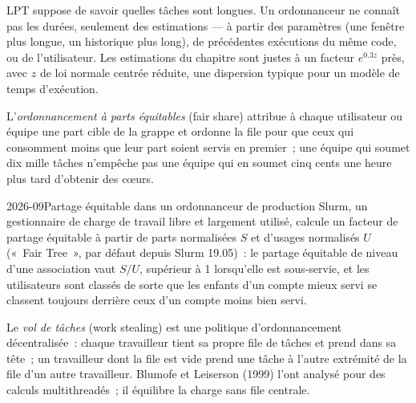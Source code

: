 \label{lst:pl:distributed-compute-and-schedulers:bound}

LPT suppose de savoir quelles tâches sont longues. Un ordonnanceur ne connaît pas les durées, seulement des estimations --- à partir des paramètres (une fenêtre plus longue, un historique plus long), de
précédentes exécutions du même code, ou de l'utilisateur. Les estimations du chapitre sont justes à un facteur $e^{0.3z}$ près, avec
$z$ de loi normale centrée réduite, une dispersion typique pour un modèle de temps d'exécution.

\begin{definition}\label{def:pl:distributed-compute-and-schedulers:fairshare}
L'\emph{ordonnancement à parts équitables} (fair share) attribue à chaque utilisateur ou équipe une part cible de la grappe et ordonne la file pour que
ceux qui consomment moins que leur part soient servis en premier~; une équipe qui soumet dix mille tâches n'empêche pas une équipe qui en soumet cinq cents
une heure plus tard d'obtenir des cœurs.
\end{definition}

\label{lst:pl:distributed-compute-and-schedulers:fairshare}

\begin{dated}{2026-09}{Partage équitable dans un ordonnanceur de production}\label{dat:pl:distributed-compute-and-schedulers:slurm}
Slurm, un gestionnaire de charge de travail libre et largement utilisé, calcule un facteur de partage équitable à partir de parts normalisées $S$ et d'usages normalisés $U$
(«~Fair Tree~», par défaut depuis Slurm 19.05)~: le partage équitable de niveau d'une association vaut $S/U$, supérieur à 1 lorsqu'elle est sous-servie,
et les utilisateurs sont classés de sorte que les enfants d'un compte mieux servi se classent toujours derrière ceux d'un compte moins bien servi.
\end{dated}

\begin{definition}\label{def:pl:distributed-compute-and-schedulers:stealing}
Le \emph{vol de tâches} (work stealing) est une politique d'ordonnancement décentralisée~: chaque travailleur tient sa propre file de tâches et prend dans sa
tête~; un travailleur dont la file est vide prend une tâche à l'autre extrémité de la file d'un autre travailleur. Blumofe et Leiserson (1999) l'ont analysé
pour des calculs multithreadés~; il équilibre la charge sans file centrale.
\end{definition}


